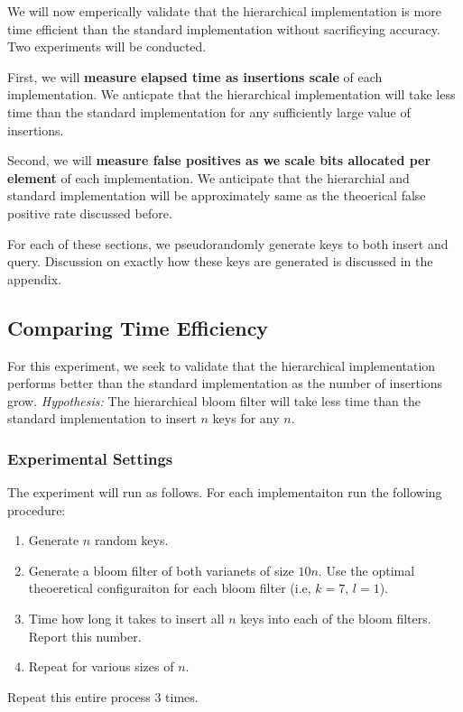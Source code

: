 We will now emperically validate that the hierarchical implementation is more time efficient than the standard implementation without sacrificying accuracy.
Two experiments will be conducted.

First, we will \textbf{measure elapsed time as insertions scale} of each implementation.
We anticpate that the hierarchical implementation will take less time than the standard implementation for any sufficiently large value of insertions.

Second, we will \textbf{measure false positives as we scale bits allocated per element} of each implementation.
We anticipate that the hierarchial and standard implementation will be approximately same as the theoerical false positive rate discussed before.

For each of these sections, we pseudorandomly generate keys to both insert and query.
Discussion on exactly how these keys are generated is discussed in the appendix.


\subsection{Comparing Time Efficiency}

For this experiment, we seek to validate that the hierarchical implementation performs better than the standard implementation as the number of insertions grow.
\textit{Hypothesis:} The hierarchical bloom filter will take less time than the standard implementation to insert $n$ keys for any $n$.

\subsubsection{Experimental Settings}

The experiment will run as follows. For each implementaiton run the following procedure:
\begin{enumerate}
    \item Generate $n$ random keys.
    \item Generate a bloom filter of both varianets of size $10n$. Use the optimal theoeretical configuraiton for each bloom filter (i.e, $k=7$, $l=1$).
    \item Time how long it takes to insert all $n$ keys into each of the bloom filters. Report this number.
    \item Repeat for various sizes of $n$.
\end{enumerate}
Repeat this entire process $3$ times.

